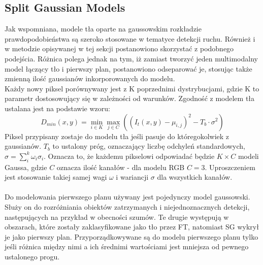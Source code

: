 \subsection{Split Gaussian Models}
\label{sec:SG}
Jak wspomniana, modele tła oparte na gaussowskim rozkładzie prawdopodobieństwa są szeroko stosowane w tematyce detekcji ruchu. Również i w metodzie opisywanej w tej sekcji postanowiono skorzystać z podobnego podejścia. Różnica polega jednak na tym, iż zamiast tworzyć jeden multimodalny model łączący tło i pierwszy plan, postanowiono odseparować je, stosując także zmienną ilość gaussianów inkorporowanych do modelu.\\
Każdy nowy piksel porównywany jest z K poprzednimi dystrybucjami, gdzie K to parametr dostosowujący się w zależności od warunków. Zgodność z modelem tła ustalana jest na podstawie wzoru:
\begin{equation}
D_{min}(x,y) = \min_{i\in K}\max_{j\in C}((I_{t}(x,y)-\mu_{i,j})^2-T_{b}\cdot\sigma^2)
\end{equation}
Piksel przypisany zostaje do modelu tła jeśli pasuje do któregokolwiek z gaussianów. $T_{b}$ to ustalony próg, oznaczający liczbę odchyleń standardowych, $\sigma = \sum_{i}^{k}\omega_{i}\sigma_{i}$. Oznacza to, że każdemu pikselowi odpowiadać będzie $K\times C$ modeli Gaussa, gdzie $C$ oznacza ilość kanałów - dla modelu RGB $C = 3$. Uproszczeniem jest stosowanie takiej samej wagi $\omega$ i wariancji $\sigma$ dla wszystkich kanałów.
\paragraph{}
Do modelowania pierwszego planu używany jest pojedynczy model gaussowski. Służy on do rozróżniania obiektów zatrzymanych i niejednoznacznych detekcji, następujących na przykład w obecności szumów. Te drugie występują w obszarach, które zostały zaklasyfikowane jako tło przez FT, natomiast SG wykrył je jako pierwszy plan. Przyporządkowywane są do modelu pierwszego planu tylko jeśli różnica między nimi a ich średnimi wartościami jest mniejsza od pewnego ustalonego progu.
